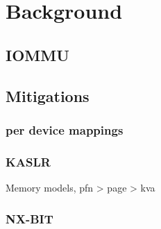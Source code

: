 \section{Background}
\subsection{IOMMU}
\subsection{Mitigations}
\subsubsection{per device mappings}
\subsubsection{KASLR}
Memory models, pfn > page > kva
\subsubsection{NX-BIT}